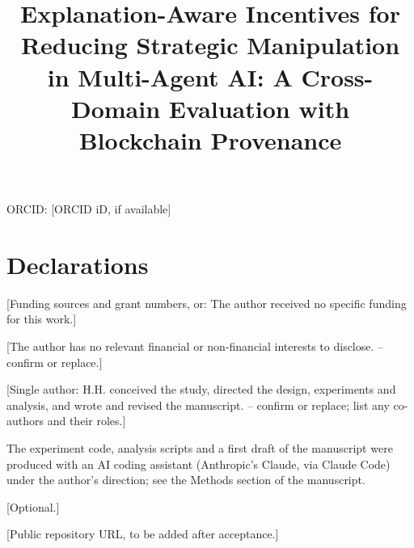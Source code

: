\documentclass[pdflatex,sn-basic]{sn-jnl}
\begin{document}
\title[Explanation-aware incentives against strategic manipulation]{Explanation-Aware
Incentives for Reducing Strategic Manipulation in Multi-Agent AI: A Cross-Domain Evaluation
with Blockchain Provenance}

\author*[1]{ }

\affil*[1]{\orgdiv{[Department]}, \orgname{[Institution]},
\orgaddress{\city{[City]}, \country{[Country]}}}


\maketitle

\noindent ORCID: [ORCID iD, if available]

\section*{Declarations}

 [Funding sources and grant numbers, or: The author received no specific
funding for this work.]

 [The author has no relevant financial or non-financial interests
to disclose. -- confirm or replace.]

 [Single author: H.H. conceived the study, directed the design,
experiments and analysis, and wrote and revised the manuscript. -- confirm or replace; list
any co-authors and their roles.]

 The experiment code, analysis scripts and a first draft of the
manuscript were produced with an AI coding assistant (Anthropic's Claude, via Claude Code)
under the author's direction; see the Methods section of the manuscript.

 [Optional.]

 [Public repository URL, to be added after acceptance.]
\end{document}
